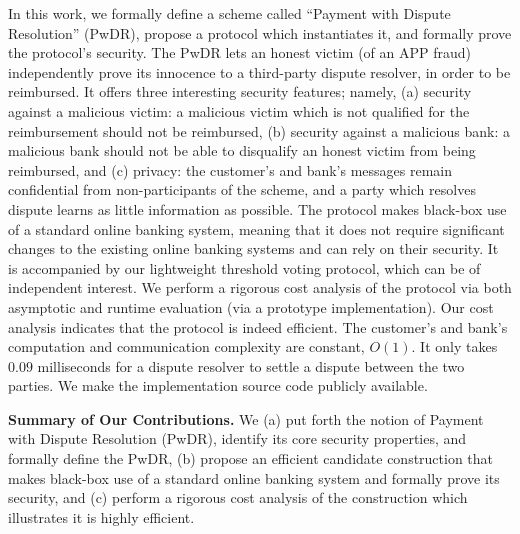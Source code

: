 In this work, we formally define a scheme called ``Payment with Dispute Resolution'' (PwDR),  propose a protocol which instantiates it, and formally prove the protocol's security.  The PwDR lets an honest victim (of an APP fraud)  independently prove its innocence to a third-party dispute resolver, in order to be reimbursed.  It offers three interesting security features; namely, (a) security against a malicious victim: a malicious victim  which is not qualified for the reimbursement should not be reimbursed, (b) security against a malicious bank: a malicious bank should not be able to disqualify an honest victim  from being reimbursed, and (c) privacy: the customer’s and bank’s messages remain confidential from non-participants of the scheme, and a party which resolves dispute  learns as little information as possible.  The  protocol makes black-box use of a standard  online banking system, meaning that it does not require significant changes to the existing online banking systems and can rely on their security. It is accompanied by our lightweight threshold voting protocol, which can be of independent interest. We perform a rigorous cost analysis of the protocol via both asymptotic and runtime  evaluation (via a prototype implementation). Our cost analysis indicates that the protocol is indeed efficient. The customer's and bank's computation and communication complexity are constant, $O(1)$. It only takes $0.09$ milliseconds for a dispute resolver to settle a dispute between the two parties. We  make  the implementation source code publicly available.
  





\vspace{2mm}

\noindent\textbf{Summary of Our Contributions.} We (a) put forth the notion of Payment with Dispute Resolution (PwDR), identify its core security properties, and  formally define the PwDR, (b) propose an efficient candidate construction that makes black-box use of a standard  online banking system and formally prove its security, and (c) perform a rigorous cost analysis of the construction which illustrates it is highly efficient.     

\

\

\



